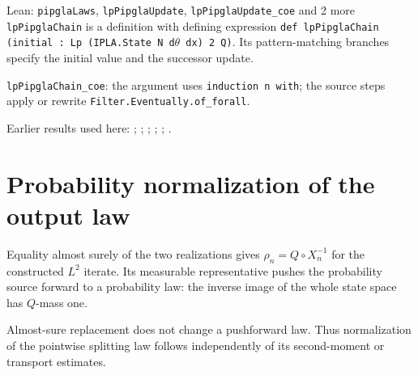 \documentclass[11pt,a4paper]{article}
\begin{document}
\begin{leanbox}{Lean: \texttt{pipglaLaws}, \texttt{lpPipglaUpdate}, \texttt{lpPipglaUpdate\_\allowbreak{}coe} and 2 more}
\texttt{lp\allowbreak{}Pipgla\allowbreak{}Chain} is a definition with defining expression \texttt{def lp\allowbreak{}Pipgla\allowbreak{}Chain (initial : Lp (IPLA.\allowbreak{}State N d\ensuremath{\theta} dx) 2 Q)}. Its pattern-matching branches specify the initial value and the successor update.



\texttt{lp\allowbreak{}Pipgla\allowbreak{}Chain\_\allowbreak{}coe}: the argument uses \texttt{induction n with}; the source steps apply or rewrite \texttt{Filter.\allowbreak{}Eventually.\allowbreak{}of\_\allowbreak{}forall}.
\end{leanbox}


Earlier results used here: \cite[Section~3.13.11]{LangevinLean2026ULASC}; \cite[Section~3.13.12]{LangevinLean2026ULASC}; \cite[Section~3.13.2]{LangevinLean2026ULASC}; \cite[Section~3.13.3]{LangevinLean2026ULASC}; \cite[Section~3.1.1]{LangevinLean2026IPLA}; \cite[Section~3.1.4]{LangevinLean2026IPLA}.

\section{\texorpdfstring{Probability normalization of the output law}{Probability normalization of the output law}}


Equality almost surely of the two realizations gives \(\rho_n=Q\circ X_n^{-1}\) for the constructed \(L^2\) iterate. Its measurable representative pushes the probability source forward to a probability law: the inverse image of the whole state space has \(Q\)-mass one.



Almost-sure replacement does not change a pushforward law. Thus normalization of the pointwise splitting law follows independently of its second-moment or transport estimates.
\end{document}
